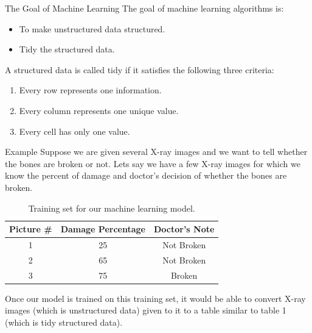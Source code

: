 \documentclass[11pt,notheorems,hyperref={pdfauthor=whatever}]{beamer}
\begin{document}
\begin{frame}{The Goal of Machine Learning}
    The goal of machine learning algorithms is:
    \begin{itemize}
        \item To make unstructured data structured.
        \item \alert{Tidy} the structured data.
    \end{itemize}
\bigskip
A structured data is called \alert{tidy} if it satisfies the following three criteria:
\begin{enumerate}
    \item Every row represents one information.
    \item Every column represents one unique value.
    \item Every cell has only one value. 
\end{enumerate}
\end{frame}

\begin{frame}{Example}
Suppose we are given several X-ray images and we want to tell whether the bones are broken or not. Lets say we have a few X-ray images for which we know the percent of damage and doctor's decision of whether the bones are broken.
\bigskip
\begin{table}[]
    \centering
    \begin{tabular}{c|c|c}
    \toprule
    Picture \# & Damage Percentage & Doctor's Note\\
    \midrule
    1 & 25 & Not Broken\\
    2 & 65 & Not Broken\\
    3 & 75 & Broken\\
    \bottomrule
\end{tabular}
    \caption{Training set for our machine learning model.}
    \label{tab:training}
\end{table}
Once our model is trained on this training set, it would be able to convert X-ray images (which is unstructured data) given to it to a table similar to table 1 (which is tidy structured data).
\end{frame}
\end{document}
